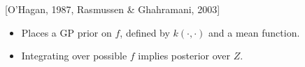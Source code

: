\documentclass[usenames,dvipsnames]{beamer}
\begin{document}
\begin{frame}[plain, t]
	\titlebodyskip
	\headerbar
	{
	}
	\bodyheaderskip
	\slidebody
	{
		{\color{mydarkblue}[O'Hagan, 1987, Rasmussen \& Ghahramani, 2003]	}
			\begin{itemize}
			
			\pause
				\item Places a GP prior on $f$, defined by $k(\cdot, \cdot)$ and a mean function.
				\item Integrating over possible $f$ implies posterior over $Z$.
				

\end{itemize}}
\end{frame}
\end{document}
